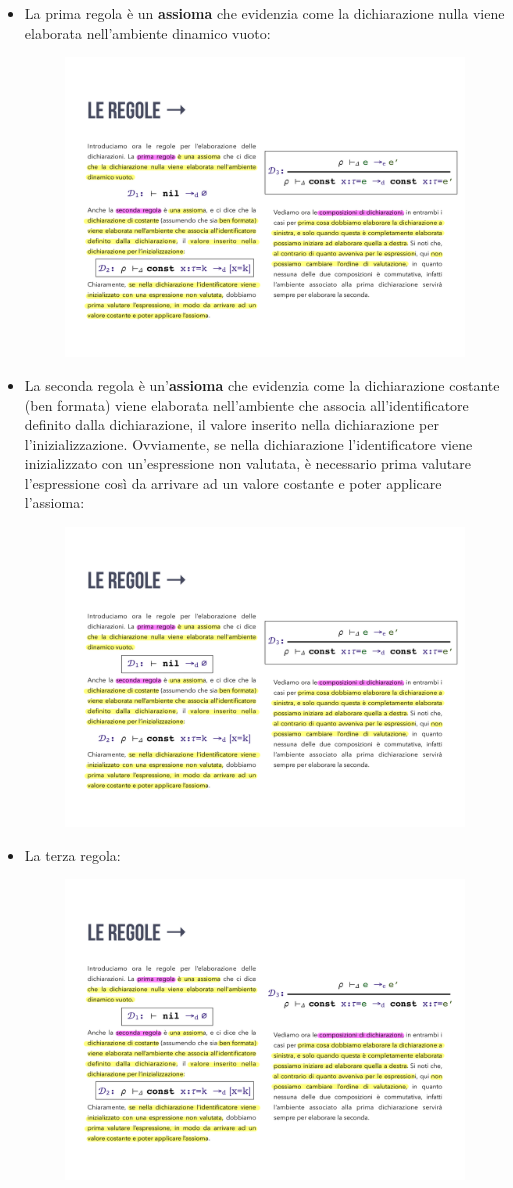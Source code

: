 \documentclass[a4paper]{article}
\begin{document}
	\begin{itemize}
		\item La prima regola è un \textbf{assioma} che evidenzia come la dichiarazione nulla viene elaborata nell'ambiente dinamico vuoto:
		\begin{figure}[!htp]
			\centering
			\includegraphics[width=.3\textwidth]{img/regola_dichiarazione-1.pdf}
		\end{figure}
	
		\item La seconda regola è un'\textbf{assioma} che evidenzia come la dichiarazione costante (ben formata) viene elaborata nell'ambiente che associa all'identificatore definito dalla dichiarazione, il valore inserito nella dichiarazione per l'inizializzazione.\newline
		Ovviamente, se nella dichiarazione l'identificatore viene inizializzato con un'espressione non valutata, è necessario prima valutare l'espressione così da arrivare ad un valore costante e poter applicare l'assioma:
		\begin{figure}[!htp]
			\centering
			\includegraphics[width=.6\textwidth]{img/regola_dichiarazione-2.pdf}
		\end{figure}
	
		\item La terza regola:
		\begin{figure}[!htp]
			\centering
			\includegraphics[width=.7\textwidth]{img/regola_dichiarazione-3.pdf}
		\end{figure}
	\end{itemize}
\end{document}
